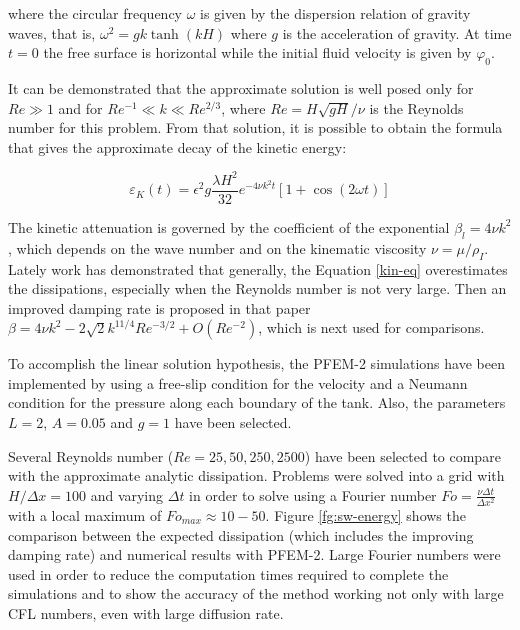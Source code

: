 where the circular frequency $\omega$ is given by the dispersion relation of gravity waves, that is, $\omega^2 = g k \tanh(kH)$ where $g$ is the acceleration of gravity. At time $t = 0$ the free surface is horizontal while the initial fluid velocity is given by $\varphi_0$.

It can be demonstrated that the approximate solution is well posed only for $Re\gg1$ and for $Re^{-1}\ll k \ll Re^{2/3}$, where $Re=H\sqrt{gH}/\nu$ is the Reynolds number for this problem. From that solution, it is possible to obtain the formula that gives the approximate decay of the kinetic energy\cite{Lighthill01}:

\begin{equation}
 \varepsilon_K(t) = \epsilon^2g\frac{\lambda H^2}{32}e^{-4\nu k^2t}\left[1+\cos(2\omega t)\right]
 \label{kin-eq}
\end{equation}

The kinetic attenuation is governed by the coefficient of the exponential $\beta_l = 4\nu k^2$, which depends on the wave number and on the kinematic viscosity $\nu = \mu/\rho_{I}$. Lately work\cite{Antuono13} has demonstrated that generally, the Equation \ref{kin-eq} overestimates the dissipations, especially when the Reynolds number is not very large. Then an improved damping rate is proposed in that paper $\beta = 4\nu k^2 -  2\sqrt{2}k^{11/4}Re^{-3/2}+O(Re^{-2})$, which is next used for comparisons.

To accomplish the linear solution hypothesis, the PFEM-2 simulations have been implemented by using a free-slip condition for the velocity and a Neumann condition for the pressure along each boundary of the tank. Also, the parameters $L=2$, $A=0.05$ and $g=1$ have been selected.

Several Reynolds number ($Re=25,50,250,2500$) have been selected to compare with the approximate analytic dissipation. Problems were solved into a grid with $H/\Delta x=100$ and varying $\Delta t$ in order to solve using a Fourier number $Fo=\frac{\nu\Delta t}{\Delta x^2}$ with a local maximum of $Fo_{max}\approx10-50$. Figure \ref{fg:sw-energy} shows the comparison between the expected dissipation (which includes the improving damping rate) and numerical results with PFEM-2. Large Fourier numbers were used in order to reduce the computation times required to complete the simulations and to show the accuracy of the method working not only with large CFL numbers, even with large diffusion rate.

